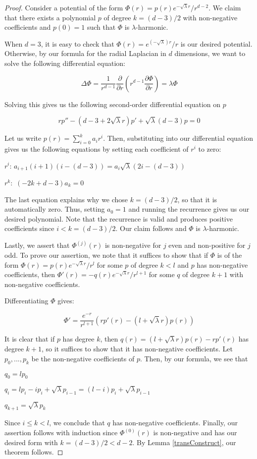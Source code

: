 \AlmostHarmReal*

\begin{proof}
Consider a potential of the form $\Phi(r) = p(r)e^{-\sqrt{\lambda}r}/r^{d-2}$. We claim that there exists a polynomial $p$ of degree $k = (d-3)/2$ with non-negative coefficients and $p(0) = 1$ such that $\Phi$ is $\lambda$-harmonic.

When $d = 3$, it is easy to check that $\Phi(r) = e^{(-\sqrt{\lambda})r}/r$ is our desired potential. Otherwise, by our formula for the radial Laplacian in $d$ dimensions, we want to solve the following differential equation:

\[\Delta \Phi =  \frac{1}{r^{d-1}} \frac{\partial}{\partial r} (r^{d-1} \frac{\partial \Phi}{\partial r}) =\lambda \Phi\]

Solving this gives us the following second-order differential equation on $p$

\[rp'' - (d-3+2\sqrt{\lambda}r)p' +\sqrt{\lambda} (d-3)p = 0\]

Let us write $p(r) = \sum_{i=0}^k a_i r^i$. Then, substituting into our differential equation gives us the following equations by setting each coefficient of $r^i$ to zero:

$r^i$:  $a_{i+1}(i+1)(i - (d-3)) = a_i \sqrt{\lambda} (2i-(d-3))$

$r^k:$ $(-2k +d-3)a_k = 0$

The last equation explains why we chose $k = (d-3)/2$, so that it is automatically zero. Thus, setting $a_0 = 1$ and running the recurrence gives us our desired polynomial. Note that the recurrence is valid and produces positive coefficients since $i < k  = (d-3)/2$. Our claim follows and $\Phi$ is $\lambda$-harmonic.

Lastly, we assert that $\Phi^{(j)}(r)$ is non-negative for $j$ even and non-positive for $j$ odd. To prove our assertion, we note that it suffices to show that if $\Phi$ is of the form $\Phi(r) = p(r) e^{-\sqrt{\lambda}r}/r^{l}$ for some $p$ of degree $k < l$ and $p$ has non-negative coefficients, then $\Phi'(r) = - q(r) e^{-\sqrt{\lambda}r}/r^{l+1}$ for some $q$ of degree $k+1$ with non-negative coefficients. 

Differentiating $\Phi$ gives:

\[\Phi' = \frac{e^{-r}}{r^{l+1}} (rp'(r) - (l + \sqrt{\lambda} r)p(r))\]

It is clear that if $p$ has degree $k$, then $q(r) = (l+\sqrt{\lambda} r)p(r) - rp'(r)$ has degree $k+1$, so it suffices to show that it has non-negative coefficients. Let $p_0,..., p_k$ be the non-negative coefficients of $p$. Then, by our formula, we see that 

$q_0 = l p_0$

$q_i = lp_i - ip_i + \sqrt{\lambda}p_{i-1} = (l-i)p_i + \sqrt{\lambda}p_{i-1}$ 

$q_{k+1} = \sqrt{\lambda} p_k$

Since $i \leq k < l$, we conclude that $q$ has non-negative coefficients. Finally, our assertion follows with induction since $\Phi^{(0)}(r)$ is non-negative and has our desired form with $k = (d-3)/2 < d-2$. By Lemma \ref{transConstruct}, our theorem follows.
\end{proof}


